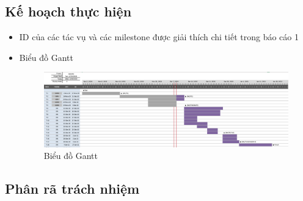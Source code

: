 \documentclass[a4paper, 12pt]{article}
\begin{document}
\clearpage 

\subsection{Kế hoạch thực hiện}

\begin{itemize}
	\item ID của các tác vụ và các milestone được giải thích chi tiết trong báo cáo 1
	\item Biểu đồ Gantt 
	\begin{figure}[H]
		\begin{center}
			\includegraphics[scale=0.59, angle=90]{./image/gantt.png}
			\caption{Biểu đồ Gantt}
		\end{center}
	\end{figure}
\end{itemize}

\subsection{Phân rã trách nhiệm}
\end{document}

